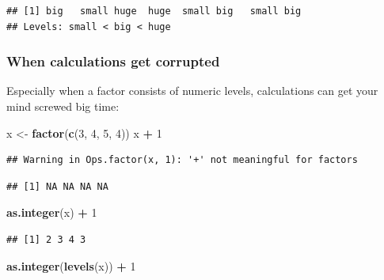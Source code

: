 \documentclass[]{book}
\newenvironment{Shaded}{\begin{snugshade}}{\end{snugshade}}
\newcommand{\DecValTok}[1]{\textcolor[rgb]{0.00,0.00,0.81}{#1}}
\newcommand{\KeywordTok}[1]{\textcolor[rgb]{0.13,0.29,0.53}{\textbf{#1}}}
\newcommand{\NormalTok}[1]{#1}
\newcommand{\OperatorTok}[1]{\textcolor[rgb]{0.81,0.36,0.00}{\textbf{#1}}}
\newcommand{\StringTok}[1]{\textcolor[rgb]{0.31,0.60,0.02}{#1}}
\begin{document}
\begin{verbatim}
## [1] big   small huge  huge  small big   small big  
## Levels: small < big < huge
\end{verbatim}

\hypertarget{when-calculations-get-corrupted}{%
\subsubsection*{When calculations get corrupted}\label{when-calculations-get-corrupted}}

Especially when a factor consists of numeric levels, calculations can get your mind screwed big time:

\begin{Shaded}
\begin{Highlighting}[]
\NormalTok{x <-}\StringTok{ }\KeywordTok{factor}\NormalTok{(}\KeywordTok{c}\NormalTok{(}\DecValTok{3}\NormalTok{, }\DecValTok{4}\NormalTok{, }\DecValTok{5}\NormalTok{, }\DecValTok{4}\NormalTok{))}
\NormalTok{x }\OperatorTok{+}\StringTok{ }\DecValTok{1}
\end{Highlighting}
\end{Shaded}

\begin{verbatim}
## Warning in Ops.factor(x, 1): '+' not meaningful for factors
\end{verbatim}

\begin{verbatim}
## [1] NA NA NA NA
\end{verbatim}

\begin{Shaded}
\begin{Highlighting}[]
\KeywordTok{as.integer}\NormalTok{(x) }\OperatorTok{+}\StringTok{ }\DecValTok{1}
\end{Highlighting}
\end{Shaded}

\begin{verbatim}
## [1] 2 3 4 3
\end{verbatim}

\begin{Shaded}
\begin{Highlighting}[]
\KeywordTok{as.integer}\NormalTok{(}\KeywordTok{levels}\NormalTok{(x)) }\OperatorTok{+}\StringTok{ }\DecValTok{1}
\end{Highlighting}
\end{Shaded}
\end{document}
